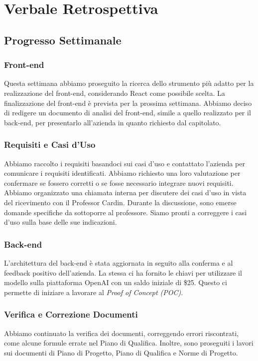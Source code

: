 \documentclass{article}
\begin{document}
\newpage
\section{Verbale Retrospettiva}

\subsection{Progresso Settimanale}
\subsubsection{Front-end}
Questa settimana abbiamo proseguito la ricerca dello strumento più adatto per la realizzazione del front-end, considerando React come possibile scelta. La finalizzazione del front-end è prevista per la prossima settimana.  
Abbiamo deciso di redigere un documento di analisi del front-end, simile a quello realizzato per il back-end, per presentarlo all'azienda in quanto richiesto dal capitolato.

\subsubsection{Requisiti e Casi d'Uso}
Abbiamo raccolto i requisiti basandoci sui casi d'uso e contattato l'azienda per comunicare i requisiti identificati. Abbiamo richiesto una loro valutazione per confermare se fossero corretti o se fosse necessario integrare nuovi requisiti.  
Abbiamo organizzato una chiamata interna per discutere dei casi d'uso in vista del ricevimento con il Professor Cardin. Durante la discussione, sono emerse domande specifiche da sottoporre al professore. Siamo pronti a correggere i casi d'uso sulla base delle sue indicazioni.

\subsubsection{Back-end}
L'architettura del back-end è stata aggiornata in seguito alla conferma e al feedback positivo dell'azienda. La stessa ci ha fornito le chiavi per utilizzare il modello sulla piattaforma OpenAI con un saldo iniziale di \$25. Questo ci permette di iniziare a lavorare al \textit{Proof of Concept (POC)}.

\subsubsection{Verifica e Correzione Documenti}
Abbiamo continuato la verifica dei documenti, correggendo errori riscontrati, come alcune formule errate nel Piano di Qualifica. Inoltre, sono proseguiti i lavori sui documenti di Piano di Progetto, Piano di Qualifica e Norme di Progetto.
\end{document}
